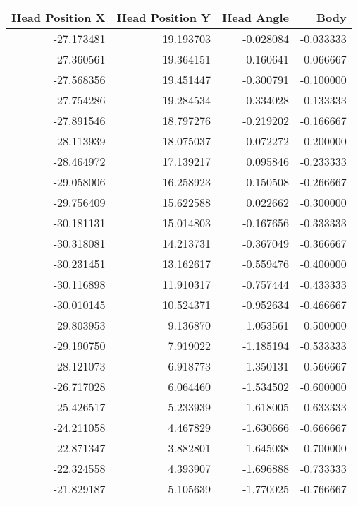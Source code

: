 \begin{tabular}{rrrr}
\toprule
 Head Position X &  Head Position Y &  Head Angle &       Body \\
\midrule
      -27.173481 &        19.193703 &   -0.028084 &  -0.033333 \\
      -27.360561 &        19.364151 &   -0.160641 &  -0.066667 \\
      -27.568356 &        19.451447 &   -0.300791 &  -0.100000 \\
      -27.754286 &        19.284534 &   -0.334028 &  -0.133333 \\
      -27.891546 &        18.797276 &   -0.219202 &  -0.166667 \\
      -28.113939 &        18.075037 &   -0.072272 &  -0.200000 \\
      -28.464972 &        17.139217 &    0.095846 &  -0.233333 \\
      -29.058006 &        16.258923 &    0.150508 &  -0.266667 \\
      -29.756409 &        15.622588 &    0.022662 &  -0.300000 \\
      -30.181131 &        15.014803 &   -0.167656 &  -0.333333 \\
      -30.318081 &        14.213731 &   -0.367049 &  -0.366667 \\
      -30.231451 &        13.162617 &   -0.559476 &  -0.400000 \\
      -30.116898 &        11.910317 &   -0.757444 &  -0.433333 \\
      -30.010145 &        10.524371 &   -0.952634 &  -0.466667 \\
      -29.803953 &         9.136870 &   -1.053561 &  -0.500000 \\
      -29.190750 &         7.919022 &   -1.185194 &  -0.533333 \\
      -28.121073 &         6.918773 &   -1.350131 &  -0.566667 \\
      -26.717028 &         6.064460 &   -1.534502 &  -0.600000 \\
      -25.426517 &         5.233939 &   -1.618005 &  -0.633333 \\
      -24.211058 &         4.467829 &   -1.630666 &  -0.666667 \\
      -22.871347 &         3.882801 &   -1.645038 &  -0.700000 \\
      -22.324558 &         4.393907 &   -1.696888 &  -0.733333 \\
      -21.829187 &         5.105639 &   -1.770025 &  -0.766667 \\

\end{tabular}

